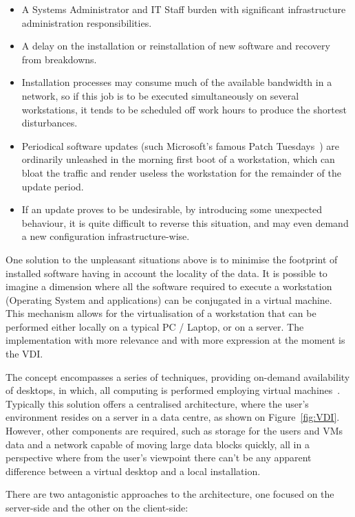 \begin{itemize}
	\item A Systems Administrator and IT Staff burden with significant infrastructure administration responsibilities.
	\item A delay on the installation or reinstallation of new software and recovery from breakdowns.
	\item Installation processes may consume much of the available bandwidth in a network, so if this job is to be executed simultaneously on several workstations, it tends to be scheduled off work hours to produce the shortest disturbances.
	\item Periodical software updates (such Microsoft's famous Patch Tuesdays~\cite{patch_2017}) are ordinarily unleashed in the morning first boot of a workstation, which can bloat the traffic and render useless the workstation for the remainder of the update period.
	\item If an update proves to be undesirable, by introducing some unexpected behaviour, it is quite difficult to reverse this situation, and may even demand a new configuration infrastructure-wise.
\end{itemize}

One solution to the unpleasant situations above is to minimise the footprint of installed software having in account the locality of the data. 
It is possible to imagine a dimension where all the software required to execute a workstation (Operating System and applications) can be conjugated in a virtual machine. This mechanism allows for the virtualisation of a workstation that can be performed either locally on a typical PC / Laptop, or on a server. The implementation with more relevance and with more expression at the moment is the \gls{VDI}.

The concept encompasses a series of techniques, providing on-demand availability of desktops, in which, all computing is performed employing virtual machines~\cite{VMWare_VDI2006}.
Typically this solution offers a centralised architecture, where the user's environment resides on a server in a data centre, as shown on Figure~\ref{fig:VDI}. However, other components are required, such as storage for the users and VMs data and a network capable of moving large data blocks quickly, all in a perspective where from the user's viewpoint there can't be any apparent difference between a virtual desktop and a local installation.

There are two antagonistic approaches to the architecture, one focused on the server-side and the other on the client-side:



